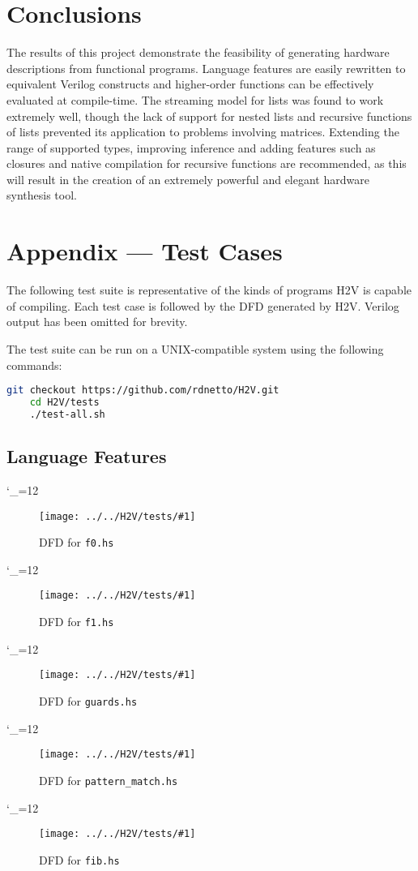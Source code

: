\documentclass[english,onecolumn]{scrartcl}
\begin{document}
\section{Conclusions}
The results of this project demonstrate the feasibility of generating hardware descriptions from functional programs.
Language features are easily rewritten to equivalent Verilog constructs and higher-order functions can be effectively
evaluated at compile-time. The streaming model for lists was found to work extremely well, though the lack of support for nested
lists and recursive functions of lists prevented its application to problems involving matrices. Extending the range of supported
types, improving inference and adding features such as closures and native compilation for recursive functions are recommended,
as this will result in the creation of an extremely powerful and elegant hardware synthesis tool.

\pagebreak{}
\appendix
\section{Appendix --- Test Cases}
The following test suite is representative of the kinds of programs H2V is capable of compiling. Each test case is followed by the
DFD generated by H2V. Verilog output has been omitted for brevity.

The test suite can be run on a UNIX-compatible system using the following commands:

\begin{lstlisting}[language=bash]
    git checkout https://github.com/rdnetto/H2V.git
    cd H2V/tests
    ./test-all.sh
\end{lstlisting}

\newcommand\insertTestCase{\begingroup\catcode`_=12 \doInsTC}
\newcommand\doInsTC[2]{
    \minipage{\linewidth}
        \label{test:#1}
        
    \endminipage
    \begin{figure}[htbp]
        \texttt{[image: ../../H2V/tests/\#1]}
        \caption{DFD for \texttt{#1.hs}}
    \end{figure}}

\subsection{Language Features}
\label{sec:testLangFeat}
\insertTestCase{f0}{scale=0.25}
\insertTestCase{f1}{scale=0.25}
\insertTestCase{guards}{scale=0.25}
\insertTestCase{pattern_match}{width=\textwidth}
\insertTestCase{fib}{width=\textwidth}
\end{document}
